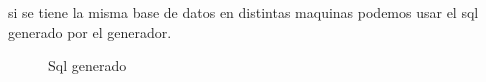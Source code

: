 si se tiene la misma base de datos en distintas maquinas podemos usar el sql generado por el generador.
\begin{figure}[H]
\caption{Sql generado}\label{fig:sqlGenerated}
\centering
{}
\end{figure}





